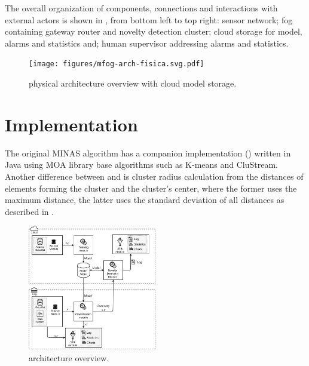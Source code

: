 \documentclass[conference]{IEEEtran}
\begin{document}
The overall organization of components, connections and interactions with external
actors is shown in ,
from bottom left to top right: sensor network; fog containing gateway router
and novelty detection cluster; cloud storage for model, alarms and statistics
and; human supervisor addressing alarms and statistics.

\begin{figure}[hbt]
  \centering
  \texttt{[image: figures/mfog-arch-fisica.svg.pdf]}
  \caption{\mfog physical architecture overview with cloud model storage.}
  \label{fig:mfog-phy-arch-cloud}
\end{figure}

\section{Implementation}\label{sec:implementation}

The original MINAS algorithm has a companion implementation ()
written in Java using MOA library base algorithms such as K-means and CluStream.
Another difference between  and \mfog is cluster radius calculation
from the distances of elements forming the cluster and the cluster's center,
where the former uses the maximum distance, the latter uses the standard deviation
of all distances as described in \cite{Faria2016minas}.

\begin{figure}[htb]
\centerline{\includegraphics[width=0.5\textwidth]{figures/mfog-arch-v2_en.png}}
\caption{\mfog architecture overview.}
\label{fig:mfog-architecture}
\end{figure}
\end{document}
